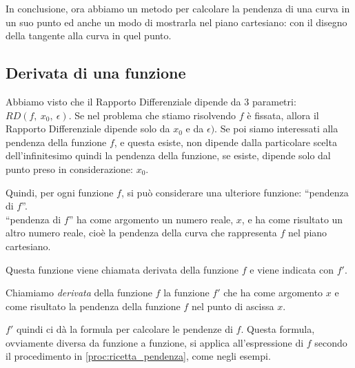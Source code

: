 In conclusione, ora abbiamo un metodo per calcolare la pendenza di una 
curva in un suo punto ed anche un modo di mostrarla nel piano cartesiano: 
con il disegno della tangente alla curva in quel punto. 

\subsection{Derivata di una funzione}
\label{subsec:differenziazione_derivatafunzione}
Abbiamo visto che il Rapporto Differenziale dipende da \(3\) parametri:
\(RD(f,~x_0,~\epsilon)\). 
Se nel problema che stiamo risolvendo \(f\) è fissata, allora il Rapporto 
Differenziale dipende solo da \(x_0\) e da \(\epsilon)\). 
Se poi siamo interessati alla pendenza della funzione \(f\), 
e questa esiste, non dipende dalla particolare scelta dell'infinitesimo 
quindi la pendenza della funzione, se esiste, dipende solo dal punto preso 
in considerazione: \(x_0\).

Quindi, per ogni funzione \(f\), si può considerare una ulteriore funzione:  
``pendenza di \(f\)''. \\
``pendenza di \(f\)'' ha come argomento un numero reale, \(x\), 
e ha come risultato un altro numero reale, cioè la pendenza della curva che 
rappresenta \(f\) nel piano cartesiano.

Questa funzione viene chiamata derivata della funzione \(f\) 
e viene indicata con \(f'\).

\begin{definizione}
Chiamiamo \emph{derivata} della funzione \(f\) la funzione \(f'\) che
ha come argomento \(x\) e come risultato la pendenza della funzione 
\(f\) nel punto di ascissa \(x\).
\end{definizione}

\(f'\) quindi ci dà la formula per calcolare le pendenze 
di \(f\). Questa formula, ovviamente diversa da funzione a funzione, 
si applica all'espressione di \(f\) secondo il procedimento in 
\ref{proc:ricetta_pendenza}, come negli esempi.

